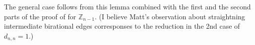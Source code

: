 \documentclass[11pt,reqno]{amsart}
\DeclareMathOperator{\Pic}{Pic}
\theoremstyle{definition}
\newtheorem{myeg}[mydef]{Example}
\theoremstyle{plain}
\newtheorem{lem}[mydef]{Lemma}
\begin{document}
The general case follows from this lemma combined with the first and the second parts of the proof of  for $\mathbb{Z}_{n-1}$. (I believe Matt's observation about straightning intermediate birational edges corresponses to the reduction in the 2nd case of $d_{n,n}=1$.)





\end{document}
